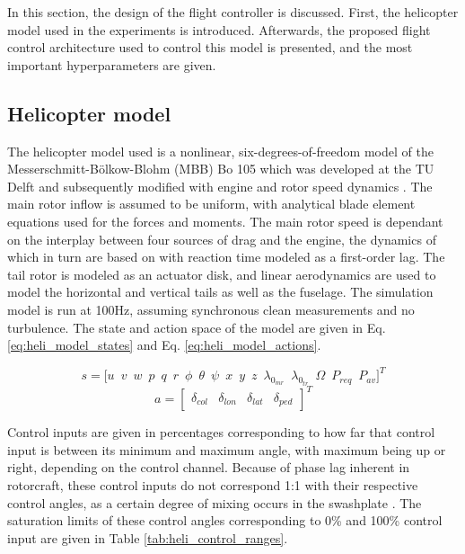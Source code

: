 In this section, the design of the flight controller is discussed. First, the helicopter model used in the experiments is introduced. Afterwards, the proposed flight control architecture used to control this model is presented, and the most important hyperparameters are given.

\subsection{Helicopter model} \label{ssec:helimodel}

The helicopter model used is a nonlinear, six-degrees-of-freedom model of the Messerschmitt-Bölkow-Blohm (MBB) Bo 105 which was developed at the TU Delft \cite{Pavel1996, VanDerVorst1998} and subsequently modified with engine and rotor speed dynamics \cite{Gille2006}. The main rotor inflow is assumed to be uniform, with analytical blade element equations used for the forces and moments. The main rotor speed is dependant on the interplay between four sources of drag and the engine, the dynamics of which in turn are based on \cite{book:padfield} with reaction time modeled as a first-order lag. The tail rotor is modeled as an actuator disk, and linear aerodynamics are used to model the horizontal and vertical tails as well as the fuselage. The simulation model is run at 100Hz, assuming synchronous clean measurements and no turbulence. The state and action space of the model are given in Eq. \eqref{eq:heli_model_states} and Eq. \eqref{eq:heli_model_actions}.

\begin{equation} \label{eq:heli_model_states}
    s = \Big[u \enspace v \enspace w \enspace p \enspace q \enspace r \enspace \phi \enspace \theta\enspace \psi\enspace x\enspace y\enspace z\enspace \lambda_{0_{mr}}\enspace \lambda_{0_{tr}}\enspace \Omega \enspace P_{req}\enspace P_{av} \Big]^T
\end{equation}
\begin{equation} \label{eq:heli_model_actions}
    a = \begin{bmatrix} \delta_{col} & \delta_{lon} & \delta_{lat} & \delta_{ped} \end{bmatrix}^T
\end{equation}

Control inputs are given in percentages corresponding to how far that control input is between its minimum and maximum angle, with maximum being up or right, depending on the control channel. Because of phase lag inherent in rotorcraft, these control inputs do not correspond 1:1 with their respective control angles, as a certain degree of mixing occurs in the swashplate \cite{book:padfield}. The saturation limits of these control angles corresponding to 0\% and 100\% control input are given in Table \ref{tab:heli_control_ranges}. 

